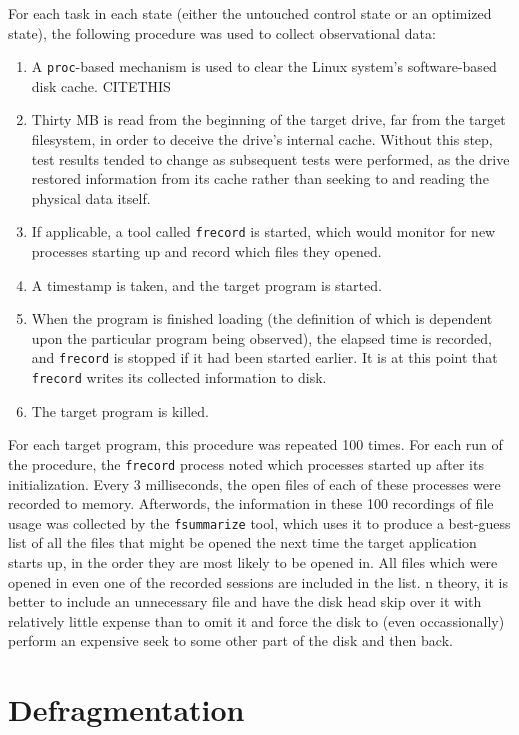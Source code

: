 \documentclass[10pt,twocolumn,letterpaper]{article}
\begin{document}
For each task in each state (either the untouched control state or an optimized state), the
following procedure was used to collect observational data:
\begin{enumerate}
\item A \texttt{proc}-based mechanism is used to clear the Linux system's software-based disk cache. CITETHIS
\item Thirty MB is read from the beginning of the target drive, far from the target filesystem, in order to deceive the drive's internal cache. Without this step, test results tended to change as subsequent tests were performed, as the drive restored information from its cache rather than seeking to and reading the physical data itself.
\item If applicable, a tool called \texttt{frecord} is started, which would monitor for new processes starting up and record which
files they opened.
\item A timestamp is taken, and the target program is started.
\item When the program is finished loading (the definition of which is dependent upon the particular program being observed), the elapsed time is recorded, and \texttt{frecord} is stopped if it had been started earlier. It is at this
point that \texttt{frecord} writes its collected information to disk.
\item The target program is killed.
\end{enumerate}

For each target program, this procedure was repeated 100 times. For each run of the procedure, the \texttt{frecord}
process noted which processes started up after its initialization. Every 3 milliseconds, the open files of each
of these processes were recorded to memory. Afterwords, the information in these 100 recordings of file usage
was collected by the \texttt{fsummarize} tool, which uses it to produce a best-guess list of all the files
that might be opened the next time the target application starts up, in the order they are most likely to be
opened in. All files which were opened in even one of the recorded sessions are included in the list. n theory,
it is better to include an unnecessary file and have the disk head skip over it with relatively little expense than to omit it and force the disk to (even occassionally) perform an expensive seek to some other part of the disk
and then back.

\section{Defragmentation}
\end{document}
